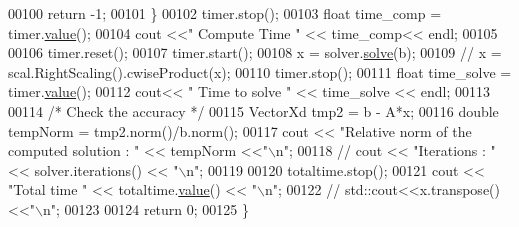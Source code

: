 \begin{DoxyCode}
00100     \textcolor{keywordflow}{return} -1; 
00101   \}
00102   timer.stop(); 
00103   \textcolor{keywordtype}{float} time\_comp = timer.\hyperlink{class_eigen_1_1_bench_timer_a26760f963ed8b64c126159bfea57735e}{value}(); 
00104   cout <<\textcolor{stringliteral}{" Compute Time "} << time\_comp<< endl; 
00105   
00106   timer.reset();
00107   timer.start();
00108   x = solver.\hyperlink{group___sparse_core___module_a4a66e9498b06e3ec4ec36f06b26d4e8f}{solve}(b);
00109 \textcolor{comment}{//   x = scal.RightScaling().cwiseProduct(x);}
00110   timer.stop();
00111   \textcolor{keywordtype}{float} time\_solve = timer.\hyperlink{class_eigen_1_1_bench_timer_a26760f963ed8b64c126159bfea57735e}{value}(); 
00112   cout<< \textcolor{stringliteral}{" Time to solve "} << time\_solve << endl; 
00113  
00114   \textcolor{comment}{/* Check the accuracy */}
00115   VectorXd tmp2 = b - A*x;
00116   \textcolor{keywordtype}{double} tempNorm = tmp2.norm()/b.norm();
00117   cout << \textcolor{stringliteral}{"Relative norm of the computed solution : "} << tempNorm <<\textcolor{stringliteral}{"\(\backslash\)n"};
00118 \textcolor{comment}{//   cout << "Iterations : " << solver.iterations() << "\(\backslash\)n"; }
00119   
00120   totaltime.stop();
00121   cout << \textcolor{stringliteral}{"Total time "} << totaltime.\hyperlink{class_eigen_1_1_bench_timer_a26760f963ed8b64c126159bfea57735e}{value}() << \textcolor{stringliteral}{"\(\backslash\)n"};
00122 \textcolor{comment}{//  std::cout<<x.transpose()<<"\(\backslash\)n";}
00123   
00124   \textcolor{keywordflow}{return} 0;
00125 \}
\end{DoxyCode}
